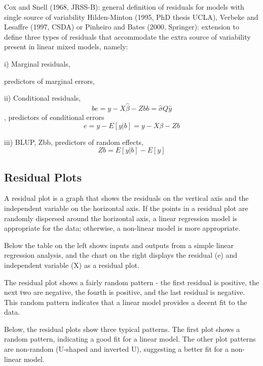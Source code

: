 \documentclass[12pt, a4paper]{report}
\theoremstyle{plain}
\theoremstyle{definition}
\theoremstyle{remark}
\begin{document}
	
	Cox and Snell (1968, JRSS-B): general definition of residuals for
	models with single source of variability
	Hilden-Minton (1995, PhD thesis UCLA), Verbeke and Lesaffre
	(1997, CSDA) or Pinheiro and Bates (2000, Springer): extension to
	define three types of residuals that accommodate the extra source of
	variability present in linear mixed models, namely:
	
	i) Marginal residuals, 
	
	predictors of marginal errors, 
	
	
	ii) Conditional residuals, 
	\[be = y − X\hat{\beta} − Zbb = \hat{\sigma}Q\hat{y}\] , predictors of
	conditional errors 
	\[e = y − E[y|b] = y − X\beta − Zb\]
	
	iii) BLUP, Zbb, predictors of random effects,
	\[ Zb = E[y|b] − E[y]\]
	
	\subsection{Residual Plots}
	A residual plot is a graph that shows the residuals on the vertical axis and the independent variable on the horizontal axis. If the points in a residual plot are randomly dispersed around the horizontal axis, a linear regression model is appropriate for the data; otherwise, a non-linear model is more appropriate.
	
	Below the table on the left shows inputs and outputs from a simple linear regression analysis, and the chart on the right displays the residual (e) and independent variable (X) as a residual plot.
	
	\newpage
	The residual plot shows a fairly random pattern - the first residual is positive, the next two are negative, the fourth is positive, and the last residual is negative. This random pattern indicates that a linear model provides a decent fit to the data.
	
	Below, the residual plots show three typical patterns. The first plot shows a random pattern, indicating a good fit for a linear model. The other plot patterns are non-random (U-shaped and inverted U), suggesting a better fit for a non-linear model.
	
\end{document}
